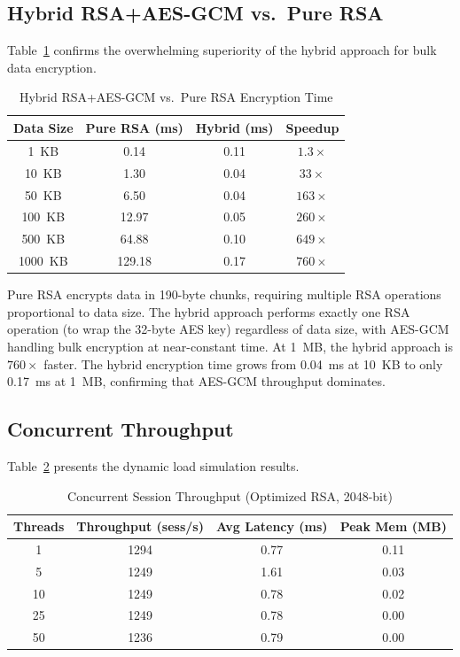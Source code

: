 \documentclass[journal]{IEEEtran}
\begin{document}
\subsection{Hybrid RSA+AES-GCM vs.\ Pure RSA}

Table~\ref{tab:hybrid} confirms the overwhelming superiority of the hybrid approach for bulk data encryption.

\begin{table}[!t]
\caption{Hybrid RSA+AES-GCM vs.\ Pure RSA Encryption Time}
\label{tab:hybrid}
\centering
\begin{tabular}{|c|c|c|c|}
\hline
\textbf{Data Size} & \textbf{Pure RSA (ms)} & \textbf{Hybrid (ms)} & \textbf{Speedup} \\
\hline
1~KB & 0.14 & 0.11 & $1.3\times$ \\
\hline
10~KB & 1.30 & 0.04 & $33\times$ \\
\hline
50~KB & 6.50 & 0.04 & $163\times$ \\
\hline
100~KB & 12.97 & 0.05 & $260\times$ \\
\hline
500~KB & 64.88 & 0.10 & $649\times$ \\
\hline
1000~KB & 129.18 & 0.17 & $760\times$ \\
\hline
\end{tabular}
\end{table}

Pure RSA encrypts data in 190-byte chunks, requiring multiple RSA operations proportional to data size. The hybrid approach performs exactly one RSA operation (to wrap the 32-byte AES key) regardless of data size, with AES-GCM handling bulk encryption at near-constant time. At 1~MB, the hybrid approach is $760\times$ faster. The hybrid encryption time grows from 0.04~ms at 10~KB to only 0.17~ms at 1~MB, confirming that AES-GCM throughput dominates.

\subsection{Concurrent Throughput}

Table~\ref{tab:concurrency} presents the dynamic load simulation results.

\begin{table}[!t]
\caption{Concurrent Session Throughput (Optimized RSA, 2048-bit)}
\label{tab:concurrency}
\centering
\begin{tabular}{|c|c|c|c|}
\hline
\textbf{Threads} & \textbf{Throughput (sess/s)} & \textbf{Avg Latency (ms)} & \textbf{Peak Mem (MB)} \\
\hline
1 & 1294 & 0.77 & 0.11 \\
\hline
5 & 1249 & 1.61 & 0.03 \\
\hline
10 & 1249 & 0.78 & 0.02 \\
\hline
25 & 1249 & 0.78 & 0.00 \\
\hline
50 & 1236 & 0.79 & 0.00 \\
\hline
\end{tabular}
\end{table}
\end{document}
